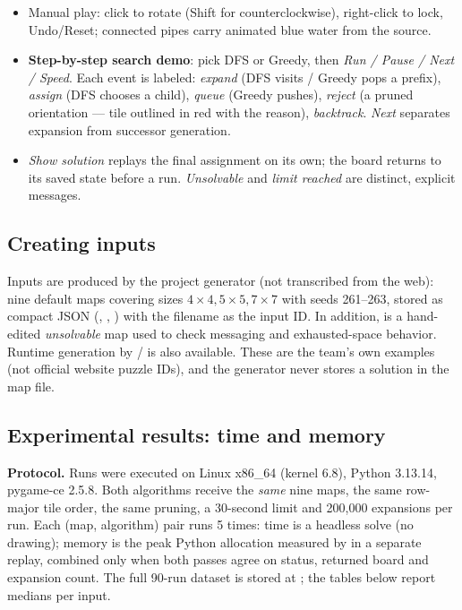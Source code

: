 \begin{itemize}
\item Manual play: click to rotate (Shift for counterclockwise), right-click to
lock, Undo/Reset; connected pipes carry animated blue water from the source.
\item \textbf{Step-by-step search demo}: pick DFS or Greedy, then \emph{Run /
Pause / Next / Speed}. Each event is labeled: \emph{expand} (DFS visits / Greedy
pops a prefix), \emph{assign} (DFS chooses a child), \emph{queue} (Greedy pushes),
\emph{reject} (a pruned orientation --- tile outlined in red with the reason),
\emph{backtrack}. \emph{Next} separates expansion from successor generation.
\item \emph{Show solution} replays the final assignment on its own; the board
returns to its saved state before a run. \emph{Unsolvable} and \emph{limit
reached} are distinct, explicit messages.
\end{itemize}

\subsection{Creating inputs}

Inputs are produced by the project generator (not transcribed from the web):
nine default maps covering sizes $4\times4, 5\times5, 7\times7$ with seeds
261--263, stored as compact JSON (, , ) with
the filename as the input ID. In addition,  is a
hand-edited \emph{unsolvable} map used to check messaging and exhausted-space
behavior. Runtime generation by / is also
available. These are the team's own examples (not official website puzzle IDs),
and the generator never stores a solution in the map file.

\subsection{Experimental results: time and memory}

\textbf{Protocol.} Runs were executed on Linux x86\_64 (kernel 6.8), Python
3.13.14, pygame-ce 2.5.8. Both algorithms receive the \emph{same} nine maps, the
same row-major tile order, the same pruning, a 30-second limit and 200{,}000
expansions per run. Each (map, algorithm) pair runs 5 times: time is a headless
 solve (no drawing); memory is the peak Python allocation
measured by  in a separate replay, combined only when both
passes agree on status, returned board and expansion count. The full 90-run
dataset is stored at ; the tables
below report medians per input.

